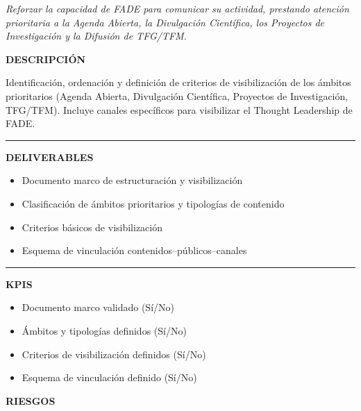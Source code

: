 \documentclass[11pt,a4paper]{scrreprt}
\newcommand{\fieldlabel}[1]{%
  {\footnotesize\sffamily\bfseries\color{mutedcolor}\MakeUppercase{#1}}\par\nopagebreak[4]
}
\newcommand{\fieldsep}{\vspace{3pt}\noindent\textcolor{bordercolor}{\rule{\linewidth}{0.4pt}}\vspace{3pt}\par}
\begin{document}
\newpage
{}
{\small\color{mutedcolor}\itshape Reforzar la capacidad de FADE para comunicar su actividad, prestando atención prioritaria a la Agenda Abierta, la Divulgación Científica, los Proyectos de Investigación y la Difusión de TFG/TFM.}\par\vspace{6pt}

\begin{tcolorbox}[pabox={comcolor}{PA2.1 \enspace\textbullet\enspace Estructuración y visibilización de los ámbitos prioritarios y contenidos estratégicos de FADE}]

\fieldlabel{Descripci\'on}
{\small Identificación, ordenación y definición de criterios de visibilización de los ámbitos prioritarios (Agenda Abierta, Divulgación Científica, Proyectos de Investigación, TFG/TFM). Incluye canales específicos para visibilizar el Thought Leadership de FADE.}\par
\fieldsep
\fieldlabel{Deliverables}
{\small \begin{itemize}[noitemsep,topsep=2pt]
\item Documento marco de estructuración y visibilización
\item Clasificación de ámbitos prioritarios y tipologías de contenido
\item Criterios básicos de visibilización
\item Esquema de vinculación contenidos--públicos--canales
\end{itemize}}\par
\fieldsep
\fieldlabel{KPIs}
{\small \begin{itemize}[noitemsep,topsep=2pt]
\item Documento marco validado (Sí/No)
\item Ámbitos y tipologías definidos (Sí/No)
\item Criterios de visibilización definidos (Sí/No)
\item Esquema de vinculación definido (Sí/No)
\end{itemize}}\par
\end{tcolorbox}
\begin{tcolorbox}[riskbox]
{\footnotesize\sffamily\bfseries\color{red!50!black} RIESGOS}\par{}
\end{tcolorbox}
\end{document}
